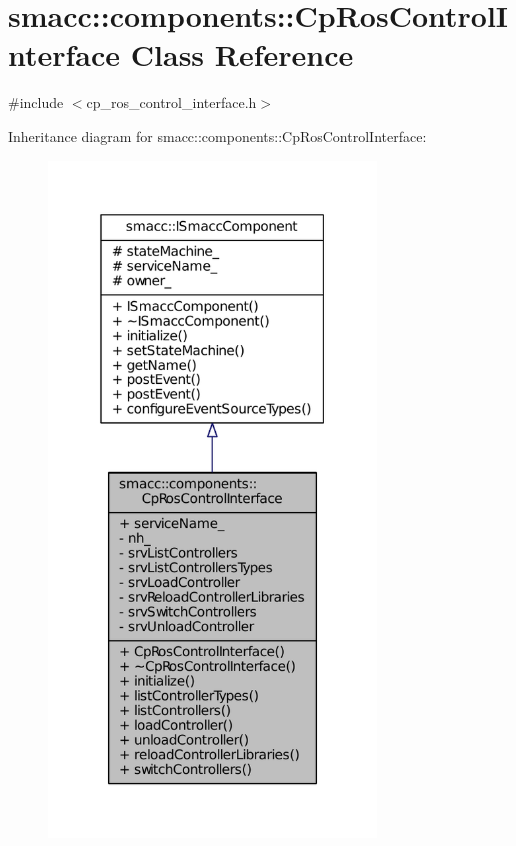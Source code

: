 \hypertarget{classsmacc_1_1components_1_1CpRosControlInterface}{}\section{smacc\+:\+:components\+:\+:Cp\+Ros\+Control\+Interface Class Reference}
\label{classsmacc_1_1components_1_1CpRosControlInterface}


{\ttfamily \#include $<$cp\+\_\+ros\+\_\+control\+\_\+interface.\+h$>$}



Inheritance diagram for smacc\+:\+:components\+:\+:Cp\+Ros\+Control\+Interface\+:
\nopagebreak
\begin{figure}[H]
\begin{center}
\leavevmode
\includegraphics[width=247pt]{classsmacc_1_1components_1_1CpRosControlInterface__inherit__graph}
\end{center}
\end{figure}


